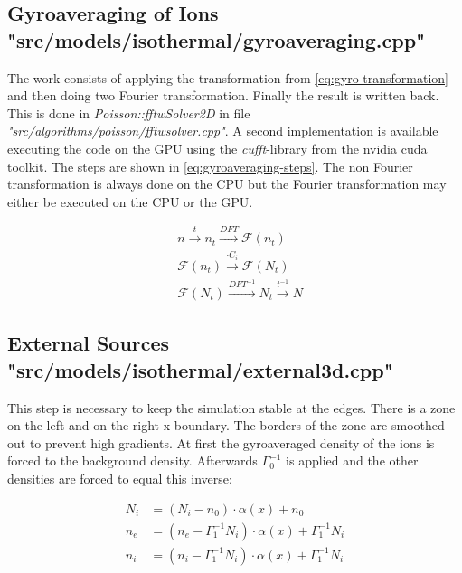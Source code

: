 \documentclass[master.tex]{subfiles}
\begin{document}
\subsection{Gyroaveraging of Ions {\small "src/models/isothermal/gyroaveraging.cpp"}}
\label{sec:components-gryoaverage}
The work consists of applying the transformation from \autoref{eq:gyro-transformation} and then doing two Fourier transformation. Finally the result is written back. This is done in \textit{Poisson::fftwSolver2D} in file \textit{"src/algorithms/poisson/fftwsolver.cpp"}.
A second implementation is available executing the code on the GPU using the \textit{cufft}-library from the nvidia cuda toolkit. The steps are shown in \autoref{eq:gyroaveraging-steps}. The non Fourier transformation is always done on the CPU but the Fourier transformation may either be executed on the CPU or the GPU.

\begin{equation}\label{eq:gyroaveraging-steps}
    \begin{split}
    &n \overset{t}{\longrightarrow} n_t \overset{DFT}{\longrightarrow} \mathcal{F}(n_t)\\
    &\mathcal{F}(n_t) \overset{\cdot C_i}{\longrightarrow} \mathcal{F}(N_t)\\
    &\mathcal{F}(N_t) \overset{DFT^{-1}}{\longrightarrow} N_t \overset{t^{-1}}{\longrightarrow} N
    \end{split}
\end{equation}

\subsection{External Sources {\small "src/models/isothermal/external3d.cpp"}}
\label{sec:components-external}
This step is necessary to keep the simulation stable at the edges. There is a zone on the left and on the right x-boundary. The borders of the zone are smoothed out to prevent high gradients. At first the gyroaveraged density of the ions is forced to the background density. Afterwards $\Gamma_0^{-1}$ is applied and the other densities are forced to equal this inverse:

\begin{align}
    N_i &= (N_i - n_0) \cdot \alpha(x) + n_0\\
    n_e &= (n_e - \Gamma_1^{-1}N_i) \cdot \alpha(x) + \Gamma_1^{-1}N_i\\
    n_i &= (n_i - \Gamma_1^{-1}N_i) \cdot \alpha(x) + \Gamma_1^{-1}N_i
\end{align}
 
\end{document}
